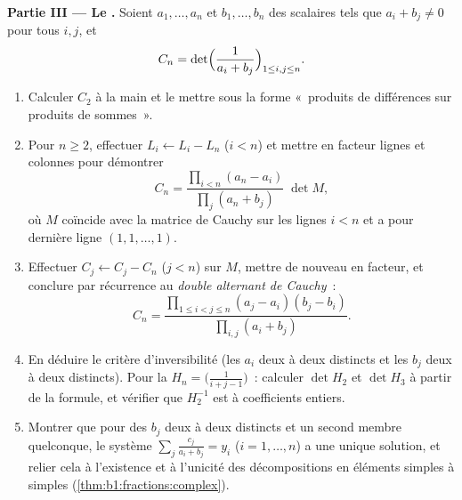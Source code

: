 \begin{problem}
\medskip
\noindent\textbf{Partie III --- Le .} Soient
$a_1, \dots, a_n$ et $b_1, \dots, b_n$ des scalaires tels que
$a_i + b_j \neq 0$ pour tous $i, j$, et
\[
C_n = \det\Bigl(\frac{1}{a_i + b_j}\Bigr)_{1 \leq i, j \leq n} .
\]
\begin{enumerate}[resume]
  \item Calculer $C_2$ à la main et le mettre sous la forme
        «~produits de différences sur produits de sommes~».
  \item Pour $n \geq 2$, effectuer $L_i \leftarrow L_i - L_n$ ($i <
        n$) et mettre en facteur lignes et colonnes pour démontrer
        \[
        C_n = \frac{\prod_{i<n}(a_n - a_i)}{\prod_{j}(a_n +
        b_j)}\;\det M,
        \]
        où $M$ coïncide avec la matrice de Cauchy sur les lignes
        $i < n$ et a pour dernière ligne $(1, 1, \dots, 1)$.
  \item Effectuer $C_j \leftarrow C_j - C_n$ ($j < n$) sur $M$,
        mettre de nouveau en facteur, et conclure par récurrence au
        \emph{double alternant de Cauchy}~:
        \[
        C_n = \frac{\prod_{1 \leq i < j \leq n}(a_j - a_i)(b_j -
        b_i)}{\prod_{i, j}(a_i + b_j)} .
        \]
  \item En déduire le critère d'inversibilité (les $a_i$ deux à deux
        distincts et les $b_j$ deux à deux distincts). Pour la
        \emph{} $H_n = \bigl(\frac{1}{i + j -
        1}\bigr)$~: calculer $\det H_2$ et $\det H_3$ à partir de la
        formule, et vérifier que $H_2^{-1}$ est à coefficients
        entiers.
  \item Montrer que pour des $b_j$ deux à deux distincts et un second
        membre quelconque, le système $\sum_j \frac{c_j}{a_i + b_j} =
        y_i$ ($i = 1, \dots, n$) a une unique solution, et relier cela
        à l'existence et à l'unicité des décompositions en éléments
        simples à  simples
        (\cref{thm:b1:fractions:complex}).
\end{enumerate}


\end{problem}

